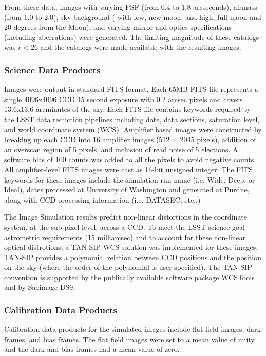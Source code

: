 From these data, images with varying PSF (from 0.4 to 1.8 arcseconds),
airmass (from 1.0 to 2.0), sky background ( with low, new moon, and
high, full moon and 20 degrees from the Moon), and varying mirror and
optics specifications (including aberrations) were generated.  The
limiting magnitude of these catalogs was $r<26$ and the catalogs were
made available with the resulting images.

\subsubsection{Science Data Products}

Images were output in standard FITS format. Each 65MB FITS file
represents a single 4096x4096 CCD 15 second exposure with 0.2 arcsec
pixels and covers 13.6x13.6 arcminutes of the sky. Each FITS file
contains keywords required by the LSST data reduction pipelines
including date, data sections, saturation level, and world coordinate
system (WCS).  Amplifier based images were constructed by breaking up
each CCD into 16 amplifier images (512 $\times$ 2045 pixels), addition
of an overscan region of 5 pixels, and inclusion of read noise of 5
elections.  A software bias of 100 counts was added to all the pixels
to avoid negative counts.  All amplifier-level FITS images were cast
as 16-bit unsigned integer. The FITS keywords for these images include
the simulation run name (i.e. Wide, Deep, or Ideal), dates processed
at University of Washington and generated at Purdue, along with CCD
processing information (i.e. DATASEC, etc..)

The Image Simulation results predict non-linear distortions in the
coordinate system, at the sub-pixel level, across a CCD. To meet the
LSST science-goal astrometric requirements (15 milliarcsec) and to
account for these non-linear optical distrotions, a TAN-SIP WCS
solution was implemented for these images. TAN-SIP provides a
polynomial relation between CCD positions and the position on the sky
(where the order of the polynomial is user-specified). The TAN-SIP
convention is supported by the publically available software package
WCSTools and by Saoimage DS9. 

\subsubsection{Calibration Data Products}

Calibration data products for the simulated images include flat field
images, dark frames, and bias frames. The flat field images were set
to a mean value of unity and the dark and bias frames had a mean value
of zero.

